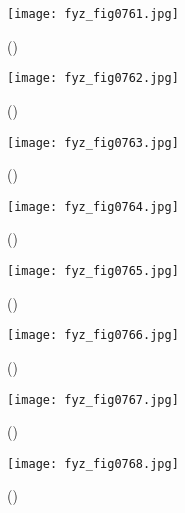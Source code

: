     \begin{figure}[ht!] %
      \centering
      \texttt{[image: fyz\_fig0761.jpg]}
      \caption{
               (\cite[s.~707]{Feynman02})}
      \label{fyz:fig0761}
    \end{figure}

    \begin{figure}[ht!] %
      \centering
      \texttt{[image: fyz\_fig0762.jpg]}
      \caption{
               (\cite[s.~707]{Feynman02})}
      \label{fyz:fig0762}
    \end{figure}

    \begin{figure}[ht!] %
      \centering
      \texttt{[image: fyz\_fig0763.jpg]}
      \caption{
               (\cite[s.~707]{Feynman02})}
      \label{fyz:fig0763}
    \end{figure}

    \begin{figure}[ht!] %
      \centering
      \texttt{[image: fyz\_fig0764.jpg]}
      \caption{
               (\cite[s.~707]{Feynman02})}
      \label{fyz:fig0764}
    \end{figure}

    \begin{figure}[ht!] %
      \centering
      \texttt{[image: fyz\_fig0765.jpg]}
      \caption{
               (\cite[s.~707]{Feynman02})}
      \label{fyz:fig0765}
    \end{figure}
    
    \begin{figure}[ht!] %
      \centering
      \texttt{[image: fyz\_fig0766.jpg]}
      \caption{
               (\cite[s.~707]{Feynman02})}
      \label{fyz:fig0766}
    \end{figure}

    \begin{figure}[ht!] %
      \centering
      \texttt{[image: fyz\_fig0767.jpg]}
      \caption{
               (\cite[s.~707]{Feynman02})}
      \label{fyz:fig0767}
    \end{figure}

    \begin{figure}[ht!] %
      \centering
      \texttt{[image: fyz\_fig0768.jpg]}
      \caption{
               (\cite[s.~707]{Feynman02})}
      \label{fyz:fig0768}
    \end{figure}

